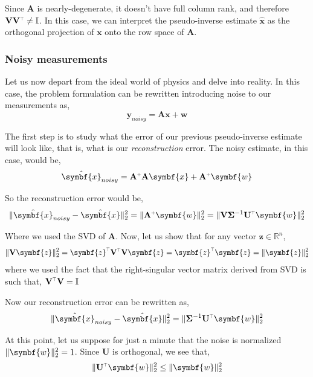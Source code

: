 \documentclass[SE,authoryear,toc]{lsstdoc}
\renewcommand{\v}[1]{\mathbf{#1}}
\newcommand{\plus}{\scalebox{0.6}{$+$}}
\newcommand{\tr}{\scalebox{0.6}{$\top$}}
\DeclarePairedDelimiter{\norm}{\lVert}{\rVert}
\begin{document}
Since $\v{A}$ is nearly-degenerate, it doesn't have full column rank, and therefore $\v{V}\v{V^{\tr}} \neq \mathbb{I}$. In this case, we can interpret the pseudo-inverse estimate $\hat{\symbf{x}}$ as the orthogonal projection of $\symbf{x}$ onto the row space of $\v{A}$. 


\subsubsection*{Noisy measurements}
Let us now depart from the ideal world of physics and delve into reality. In this case, the problem formulation can be rewritten introducing noise to our measurements as,
\begin{equation}
    \symbf{y}_{noisy} = \v{A} \symbf{x} + \symbf{w}
\end{equation}

The first step is to study what the error of our previous pseudo-inverse estimate will look like, that is, what is our \textit{reconstruction} error. The noisy estimate, in this case, would be, 
\begin{equation}
    \hat{\symbf{x}}_{noisy} = \v{A}^{\plus}\v{A}\symbf{x} +\v{A}^{\plus}\symbf{w} 
\end{equation}

So the reconstruction error would be, 
\begin{equation}
    \norm{\hat{\symbf{x}}_{noisy} - \hat{\symbf{x}}}_2^2 = \norm{\v{A}^{\plus}\symbf{w} }_2^2 = \norm{\v{V}\v{\Sigma}^{-1}\v{U}^{\tr}\symbf{w} }_2^2
\end{equation}

Where we used the SVD of $\v{A}$. Now, let us show that for any vector $\symbf{z} \in \mathbb{R}^n$, 
\begin{equation}
    \norm{\v{V}\symbf{z}}_2^2 = \symbf{z}^{\tr}\v{V}^{\tr}\v{V}\symbf{z} = \symbf{z}^{\tr}\symbf{z} =  \norm{\symbf{z}}_2^2
\end{equation}
where we used the fact that the right-singular vector matrix derived from SVD is such that, $\v{V}^{\tr}\v{V} = \mathbb{I}$

Now our reconstruction error can be rewritten as, 
\begin{equation}
    \norm{\hat{\symbf{x}}_{noisy} - \hat{\symbf{x}}}_2^2 = \norm{\v{\Sigma}^{-1}\v{U}^{\tr}\symbf{w} }_2^2
\end{equation}

At this point, let us suppose for just a minute that the noise is normalized $\norm{\symbf{w}}_2^2 = 1$. Since $\v{U}$ is orthogonal, we see that, 
\begin{equation}
    \norm{\v{U}^{\tr}\symbf{w}}_2^2 \leq \norm{\symbf{w}}^2_2
\end{equation}
\end{document}
